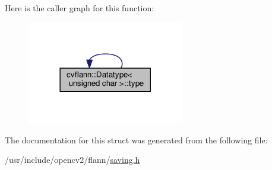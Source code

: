 Here is the caller graph for this function\-:\nopagebreak
\begin{figure}[H]
\begin{center}
\leavevmode
\includegraphics[width=194pt]{structcvflann_1_1Datatype_3_01unsigned_01char_01_4_a8b766d18ba001e44adf3b186b6067a18_icgraph}
\end{center}
\end{figure}




The documentation for this struct was generated from the following file\-:\begin{DoxyCompactItemize}
\item 
/usr/include/opencv2/flann/\hyperlink{saving_8h}{saving.\-h}\end{DoxyCompactItemize}
